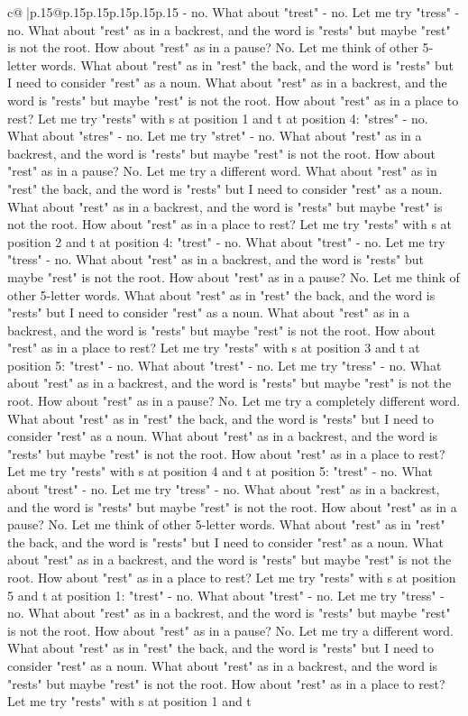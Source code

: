\documentclass{article}
\begin{document}
{\begin{supertabular}{c@{$\;$}|p{.15\linewidth}@{}p{.15\linewidth}p{.15\linewidth}p{.15\linewidth}p{.15\linewidth}p{.15\linewidth}}
{{{{-} no. What about "trest" {-} no. Let me try "tress" {-} no. What about "rest" as in a backrest, and the word is "rests" but maybe "rest" is not the root. How about "rest" as in a pause? No. Let me think of other 5{-}letter words. What about "rest" as in "rest" the back, and the word is "rests" but I need to consider "rest" as a noun. What about "rest" as in a backrest, and the word is "rests" but maybe "rest" is not the root. How about "rest" as in a place to rest? Let me try "rests" with s at position 1 and t at position 4: "stres" {-} no. What about "stres" {-} no. Let me try "stret" {-} no. What about "rest" as in a backrest, and the word is "rests" but maybe "rest" is not the root. How about "rest" as in a pause? No. Let me try a different word. What about "rest" as in "rest" the back, and the word is "rests" but I need to consider "rest" as a noun. What about "rest" as in a backrest, and the word is "rests" but maybe "rest" is not the root. How about "rest" as in a place to rest? Let me try "rests" with s at position 2 and t at position 4: "trest" {-} no. What about "trest" {-} no. Let me try "tress" {-} no. What about "rest" as in a backrest, and the word is "rests" but maybe "rest" is not the root. How about "rest" as in a pause? No. Let me think of other 5{-}letter words. What about "rest" as in "rest" the back, and the word is "rests" but I need to consider "rest" as a noun. What about "rest" as in a backrest, and the word is "rests" but maybe "rest" is not the root. How about "rest" as in a place to rest? Let me try "rests" with s at position 3 and t at position 5: "trest" {-} no. What about "trest" {-} no. Let me try "tress" {-} no. What about "rest" as in a backrest, and the word is "rests" but maybe "rest" is not the root. How about "rest" as in a pause? No. Let me try a completely different word. What about "rest" as in "rest" the back, and the word is "rests" but I need to consider "rest" as a noun. What about "rest" as in a backrest, and the word is "rests" but maybe "rest" is not the root. How about "rest" as in a place to rest? Let me try "rests" with s at position 4 and t at position 5: "trest" {-} no. What about "trest" {-} no. Let me try "tress" {-} no. What about "rest" as in a backrest, and the word is "rests" but maybe "rest" is not the root. How about "rest" as in a pause? No. Let me think of other 5{-}letter words. What about "rest" as in "rest" the back, and the word is "rests" but I need to consider "rest" as a noun. What about "rest" as in a backrest, and the word is "rests" but maybe "rest" is not the root. How about "rest" as in a place to rest? Let me try "rests" with s at position 5 and t at position 1: "trest" {-} no. What about "trest" {-} no. Let me try "tress" {-} no. What about "rest" as in a backrest, and the word is "rests" but maybe "rest" is not the root. How about "rest" as in a pause? No. Let me try a different word. What about "rest" as in "rest" the back, and the word is "rests" but I need to consider "rest" as a noun. What about "rest" as in a backrest, and the word is "rests" but maybe "rest" is not the root. How about "rest" as in a place to rest? Let me try "rests" with s at position 1 and t }}}
\end{supertabular}}
\end{document}
